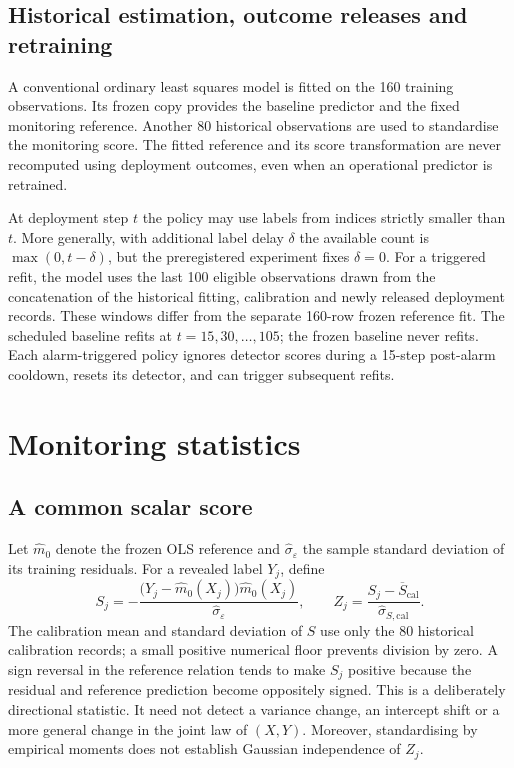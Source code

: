 \documentclass[11pt,a4paper]{article}
\begin{document}
\subsection{Historical estimation, outcome releases and retraining}
A conventional ordinary least squares model is fitted on the 160 training observations. Its frozen copy provides the baseline predictor and the fixed monitoring reference. Another 80 historical observations are used to standardise the monitoring score. The fitted reference and its score transformation are never recomputed using deployment outcomes, even when an operational predictor is retrained.

At deployment step $t$ the policy may use labels from indices strictly smaller than $t$. More generally, with additional label delay $\delta$ the available count is $\max(0,t-\delta)$, but the preregistered experiment fixes $\delta=0$. For a triggered refit, the model uses the last 100 eligible observations drawn from the concatenation of the historical fitting, calibration and newly released deployment records. These windows differ from the separate 160-row frozen reference fit. The scheduled baseline refits at $t=15,30,\ldots,105$; the frozen baseline never refits. Each alarm-triggered policy ignores detector scores during a 15-step post-alarm cooldown, resets its detector, and can trigger subsequent refits.

\section{Monitoring statistics}\label{sec:methods}
\subsection{A common scalar score}
Let $\widehat m_0$ denote the frozen OLS reference and $\widehat\sigma_\varepsilon$ the sample standard deviation of its training residuals. For a revealed label $Y_j$, define
\begin{equation}\label{eq:score}
 S_j=-\frac{\bigl(Y_j-\widehat m_0(X_j)\bigr)\widehat m_0(X_j)}{\widehat\sigma_\varepsilon},\qquad Z_j=\frac{S_j-\overline S_{\mathrm{cal}}}{\widehat\sigma_{S,\mathrm{cal}}}.
\end{equation}
The calibration mean and standard deviation of $S$ use only the 80 historical calibration records; a small positive numerical floor prevents division by zero. A sign reversal in the reference relation tends to make $S_j$ positive because the residual and reference prediction become oppositely signed. This is a deliberately directional statistic. It need not detect a variance change, an intercept shift or a more general change in the joint law of $(X,Y)$. Moreover, standardising by empirical moments does not establish Gaussian independence of $Z_j$.
\end{document}
